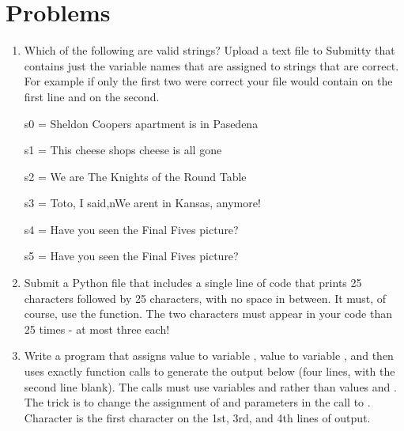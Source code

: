 \documentclass[letterpaper,10pt,english]{sphinxmanual}
\begin{document}
\section{Problems}
\label{\detokenize{lecture_notes/lec03_strings_exercises/exercises:problems}}\begin{enumerate}
\def\theenumi{\arabic{enumi}}
\def\labelenumi{\theenumi .}
\makeatletter\def\p@enumii{\p@enumi \theenumi .}\makeatother
\item {} 
Which of the following are valid strings?  Upload a text file to
Submitty that contains just the variable names that are assigned to
strings that are correct.  For example if only the first two were
correct your file would contain  on the first line and  on the
second.

\begin{sphinxVerbatim}[commandchars=\\\{\}]
\PYGZgt{}\PYGZgt{}\PYGZgt{} s0 = \PYGZdq{}Sheldon Cooper\PYGZsq{}s apartment is in Pasedena\PYGZdq{}

\PYGZgt{}\PYGZgt{}\PYGZgt{} s1 = \PYGZsq{}This cheese shop\PYGZsq{}s cheese is all gone\PYGZdq{}

\PYGZgt{}\PYGZgt{}\PYGZgt{} s2 = \PYGZdq{}\PYGZdq{}\PYGZdq{}We are
\PYGZdq{}The Knights of the Round Table\PYGZdq{}
\PYGZdq{}\PYGZdq{}\PYGZdq{}

\PYGZgt{}\PYGZgt{}\PYGZgt{} s3 = \PYGZdq{}Toto, I said,\PYGZbs{}n\PYGZdq{}We aren\PYGZsq{}t in Kansas, anymore!\PYGZdq{}


\PYGZgt{}\PYGZgt{}\PYGZgt{} s4 = \PYGZsq{}Have you seen the \PYGZdq{}Final Five\PYGZdq{}\PYGZsq{}s picture?\PYGZsq{}


\PYGZgt{}\PYGZgt{}\PYGZgt{} s5 = \PYGZdq{}Have you seen the \PYGZsq{}Final Five\PYGZsq{}\PYGZsq{}s picture?\PYGZdq{}
\end{sphinxVerbatim}

\item {} 
Submit a Python file that includes a single line of code that prints
25  characters followed by 25  characters, with no
space in between.  It must, of course, use the  function.
The two characters must appear in your code  than 25
times - at most three each!

\item {} 
Write a program that assigns value  to variable ,
value  to variable , and then uses exactly 
 function calls to generate the output below (four lines,
with the second line blank).  The  calls must use
variables  and  rather than values  and .  The
trick is to change the assignment of  and 
parameters in the call to .  Character  is the
first character on the 1st, 3rd, and 4th lines of output.


\end{enumerate}
\end{document}
